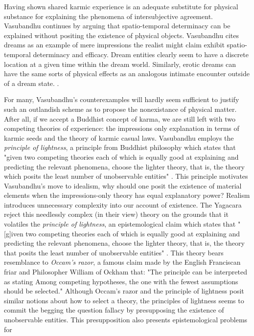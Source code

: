 Having shown shared karmic experience is an adequate substitute for physical substance for explaining the phenomena of intersubjective agreement.  Vasubandhu continues by arguing that spatio-temporal determinacy can be explained without positing the existence of physical objects. Vasubandhu cites dreams as an example of mere impressions the realist might claim exhibit spatio-temporal determinacy and efficacy. Dream entities clearly seem to have a discrete location at a given time within the dream world. Similarly, erotic dreams can have the same sorts of physical effects as an analogous intimate encounter outside of a dream state. \cite{siderits2007buddhism}. 
\newline

For many, Vasubandhu's counterexamples will hardly seem sufficient to justify such an outlandish scheme as to propose the nonexistance of physical matter. After all, if we accept a Buddhist concept of karma, we are still left with two competing theories of experience: the impressions only explanation in terms of karmic seeds and the theory of karmic casual laws. \cite{siderits2007buddhism} Vasubandhu employs the \textit{principle of lightness}, a principle from Buddhist philosophy which states that "given two competing theories each of which is equally good at explaining and predicting the relevant phenomena, choose the lighter theory, that is, the theory which posits the least number of unobservable entities" \cite{siderits2007buddhism}. This principle motivates Vasubandhu's move to idealism, why should one posit the existence of material elements when the impressions-only theory has equal explanatory power? Realism introduces unnecessary complexity into our account of existence. The Yagacara reject this needlessly complex (in their view) theory on the grounds that it volatiles the \textit{principle of lightness}, an epistemological claim which states that "[g]iven two competing theories each of which is equally good at explaining and predicting the relevant phenomena, choose the lighter theory, that is, the theory that posits the least number of unobservable entities" \cite{siderits2007buddhism}. This theory bears resemblance to \textit{Occam's razor}, a famous claim made by the English Franciscan friar and Philosopher William of Ockham that:
"The principle can be interpreted as stating Among competing hypotheses, the one with the fewest assumptions should be selected."
Although Occam's razor and the principle of lightness posit similar notions about how to select a theory, the principles of lightness seems to commit the begging the question fallacy by presupposing the existence of unobservable entities. This presupposition also presents epistemological problems for   


